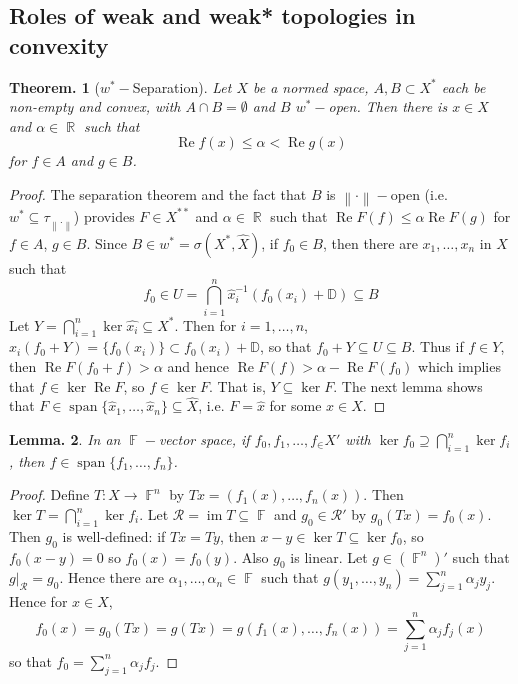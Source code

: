 \documentclass[11pt, a4paper]{memoir}
\DeclareMathOperator{\R}{{\mathbb{R}}}
\DeclareMathOperator{\F}{{\mathbb{F}}}
\newcommand{\norm}[1]{\ensuremath{\left\lVert#1\right\rVert}}
\theoremstyle{change}
\newtheorem{theorem}{Theorem.}[section]
\newtheorem{lemma}[theorem]{Lemma.}
\theoremstyle{plain}
\theoremstyle{nonumberplain}
\newtheorem{proof}{Proof}
\DeclareMathOperator{\im}{im}
\DeclareMathOperator{\spn}{span}
\renewcommand{\Re}{\ensuremath{\operatorname{Re}}}
\numberwithin{equation}{section}
\begin{document}
\subsection{Roles of weak and weak* topologies in convexity}
\begin{theorem}[$w^*-$Separation]
    Let $X$ be a normed space, $A,B\subset X^*$ each be non-empty and convex, with $A\cap B=\emptyset$ and $B$ $w^*-$open.
    Then there is $x\in X$ and $\alpha\in\R$ such that
    \begin{equation*}
        \Re f(x)\leq \alpha < \Re g(x)
    \end{equation*}
    for $f\in A$ and $g\in B$.
\end{theorem}
\begin{proof}
    The separation theorem and the fact that $B$ is $\norm{\cdot}-$open (i.e. $w^*\subseteq\tau_{\norm{\cdot}}$) provides $F\in X^{**}$ and $\alpha\in\R$ such that $\Re F(f)\leq\alpha\Re F(g)$ for $f\in A$, $g\in B$.
    Since $B\in w^*=\sigma(X^*,\hat X)$, if $f_0\in B$, then there are $x_1,\ldots,x_n$ in $X$ such that
    \begin{equation*}
        f_0\in U=\bigcap_{i=1}^n \hat x_i^{-1}(f_0(x_i)+\mathbb{D})\subseteq B
    \end{equation*}
    Let $Y=\bigcap_{i=1}^n\ker\hat{x_i}\subseteq X^*$.
    Then for $i=1,\ldots,n$, $\hat x_i(f_0+Y)=\{f_0(x_i)\}\subset f_0(x_i)+\mathbb{D}$, so that $f_0+Y\subseteq U\subseteq B$.
    Thus if $f\in Y$, then $\Re F(f_0+f)>\alpha$ and hence $\Re F(f)>\alpha-\Re F(f_0)$ which implies that $f\in\ker\Re F$, so $f\in\ker F$.
    That is, $Y\subseteq\ker F$.
    The next lemma shows that $F\in\spn\{\hat x_1,\ldots,\hat x_n\}\subseteq\hat X$, i.e. $F=\hat x$ for some $x\in X$.
\end{proof}
\begin{lemma}
    In an $\F-$vector space, if $f_0,f_1,\ldots,f_\in X'$ with $\ker f_0\supseteq\bigcap_{i=1}^n\ker f_i$, then $f\in\spn\{f_1,\ldots,f_n\}$.
\end{lemma}
\begin{proof}
    Define $T:X\to\F^n$ by $Tx=(f_1(x),\ldots,f_n(x))$.
    Then $\ker T=\bigcap_{i=1}^n\ker f_i$.
    Let $\mathcal{R}=\im T\subseteq\F$ and $g_0\in\mathcal{R}'$ by $g_0(Tx)=f_0(x)$.
    Then $g_0$ is well-defined: if $Tx=Ty$, then $x-y\in\ker T\subseteq\ker f_0$, so $f_0(x-y)=0$ so $f_0(x)=f_0(y)$.
    Also $g_0$ is linear.
    Let $g\in(\F^n)'$ such that $g|_{\mathcal{R}}=g_0$.
    Hence there are $\alpha_1,\ldots,\alpha_n\in\F$ such that $g(y_1,\ldots,y_n)=\sum_{j=1}^n\alpha_jy_j$.
    Hence for $x\in X$,
    \begin{equation*}
        f_0(x)=g_0(Tx)=g(Tx)=g(f_1(x),\ldots,f_n(x))=\sum_{j=1}^n\alpha_jf_j(x)
    \end{equation*}
    so that $f_0=\sum_{j=1}^n\alpha_jf_j$.
\end{proof}
\end{document}
